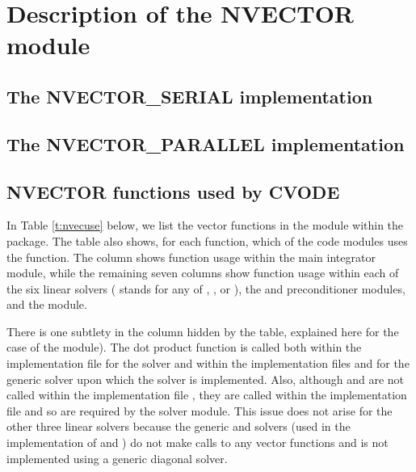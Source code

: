 \chapter{Description of the NVECTOR module}\label{s:nvector}


\section{The NVECTOR\_SERIAL implementation}\label{ss:nvec_ser}


\section{The NVECTOR\_PARALLEL implementation}\label{ss:nvec_par}


\section{NVECTOR functions used by CVODE}

In Table \ref{t:nvecuse} below, we list the vector functions in the 
{\nvector} module within the {\cvode} package.
The table also shows, for each function, which of the code modules uses
the function. The {\cvode} column shows function usage within the main
integrator module, while the remaining seven columns show function usage
within each of the six {\cvode} linear solvers ({\cvspils} stands for any
of {\cvspgmr}, {\cvspbcg}, or {\cvsptfqmr}), the {\cvbandpre} and
{\cvbbdpre} preconditioner modules, and the {\fcvode} module.

There is one subtlety in the {\cvspils} column hidden by the table, explained
here for the case of the {\cvspgmr} module). 
The dot product function  is called both within the 
implementation file  for the {\cvspgmr} solver and within 
the implementation files  and  
for the generic {\spgmr} solver upon which the {\cvspgmr} solver is implemented. 
Also, although  and  are not called within the implementation file
, they are called within the implementation file
 and so are required by the {\cvspgmr} solver module.
This issue does not arise for the other 
three {\cvode} linear solvers because the generic {\dense} and {\band} solvers 
(used in the implementation of {\cvdense} and {\cvband}) do not make calls to 
any vector functions and {\cvdiag} is not implemented using a generic diagonal solver. 

